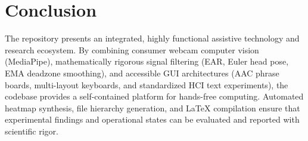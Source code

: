 \documentclass[11pt,a4paper]{article}
\begin{document}
\section{Conclusion}

The repository presents an integrated, highly functional assistive technology and research ecosystem. By combining consumer webcam computer vision (MediaPipe), mathematically rigorous signal filtering (EAR, Euler head pose, EMA deadzone smoothing), and accessible GUI architectures (AAC phrase boards, multi-layout keyboards, and standardized HCI text experiments), the codebase provides a self-contained platform for hands-free computing. Automated heatmap synthesis, file hierarchy generation, and LaTeX compilation ensure that experimental findings and operational states can be evaluated and reported with scientific rigor.
\end{document}
